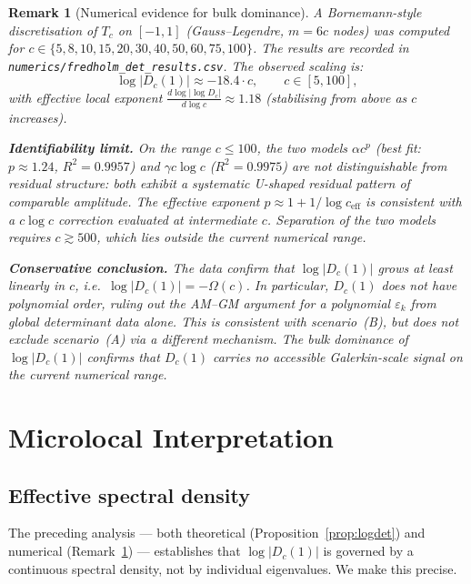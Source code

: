 \documentclass[12pt,a4paper]{article}
\newtheorem{remark}[theorem]{Remark}
\newcommand{\Tc}{T_c}
\newcommand{\Dc}{D_c}
\begin{document}
\begin{remark}[Numerical evidence for bulk dominance]
\label{rem:numerics}
A Bornemann-style discretisation of $\Tc$ on
$[-1,1]$ (Gauss--Legendre, $m = 6c$ nodes)
was computed for $c \in \{5, 8, 10, 15, 20, 30, 40, 50, 60, 75, 100\}$.
The results are recorded in
\texttt{numerics/fredholm\_det\_results.csv}.
The observed scaling is:
\[
  \log |\Dc(1)| \approx -18.4 \cdot c,
  \qquad c \in [5, 100],
\]
with effective local exponent
$\frac{d \log |\log \Dc|}{d \log c} \approx 1.18$
(stabilising from above as $c$ increases).

\medskip\noindent
\textbf{Identifiability limit.}
On the range $c \leq 100$, the two models
$\alpha c^p$ (best fit: $p \approx 1.24$, $R^2 = 0.9957$)
and $\gamma c \log c$ ($R^2 = 0.9975$)
are \emph{not distinguishable} from residual structure:
both exhibit a systematic U-shaped residual pattern
of comparable amplitude.
The effective exponent $p \approx 1 + 1/\log c_{\mathrm{eff}}$
is consistent with a $c \log c$ correction
evaluated at intermediate $c$.
Separation of the two models requires $c \gtrsim 500$,
which lies outside the current numerical range.

\medskip\noindent
\textbf{Conservative conclusion.}
The data confirm that $\log |\Dc(1)|$ grows at
least linearly in $c$, i.e.\
$\log |\Dc(1)| = -\Omega(c)$.
In particular, $\Dc(1)$ does \emph{not} have
polynomial order, ruling out the AM--GM argument
for a polynomial $\varepsilon_k$ from global
determinant data alone.
This is consistent with scenario~(B),
but does not exclude scenario~(A) via
a different mechanism.
The bulk dominance of $\log |\Dc(1)|$ confirms
that $\Dc(1)$ carries no accessible Galerkin-scale
signal on the current numerical range.
\end{remark}

\section{Microlocal Interpretation}
\label{sec:microlocal}

\subsection{Effective spectral density}

The preceding analysis --- both theoretical
(Proposition~\ref{prop:logdet}) and numerical
(Remark~\ref{rem:numerics}) --- establishes that
$\log |\Dc(1)|$ is governed by a continuous
spectral density, not by individual eigenvalues.
We make this precise.
\end{document}
